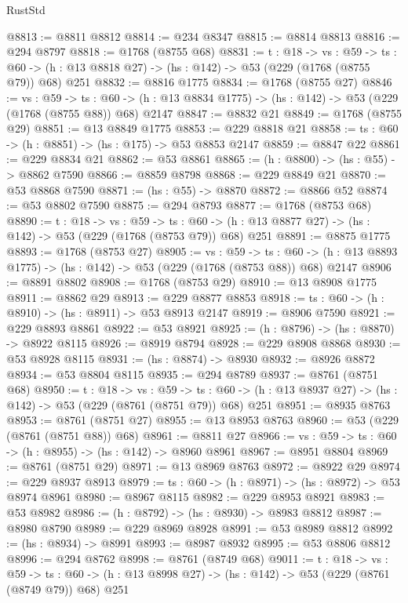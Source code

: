 \begin{lexlean}{RustStd}
\begin{coremodule}
@8813 := @8811 @8812
@8814 := @234 @8347
@8815 := @8814 @8813
@8816 := @294 @8797
@8818 := @1768 (@8755 @68)
@8831 := {t : @18} ->
  {vs : @59} ->
  {ts : @60} -> (h : @13 @8818 @27) -> (hs : @142) -> @53 (@229 (@1768 (@8755 @79)) @68) @251
@8832 := @8816 @1775
@8834 := @1768 (@8755 @27)
@8846 := {vs : @59} ->
  {ts : @60} -> (h : @13 @8834 @1775) -> (hs : @142) -> @53 (@229 (@1768 (@8755 @88)) @68) @2147
@8847 := @8832 @21
@8849 := @1768 (@8755 @29)
@8851 := @13 @8849 @1775
@8853 := @229 @8818 @21
@8858 := {ts : @60} -> (h : @8851) -> (hs : @175) -> @53 @8853 @2147
@8859 := @8847 @22
@8861 := @229 @8834 @21
@8862 := @53 @8861
@8865 := (h : @8800) -> (hs : @55) -> @8862 @7590
@8866 := @8859 @8798
@8868 := @229 @8849 @21
@8870 := @53 @8868 @7590
@8871 := (hs : @55) -> @8870
@8872 := @8866 @52
@8874 := @53 @8802 @7590
@8875 := @294 @8793
@8877 := @1768 (@8753 @68)
@8890 := {t : @18} ->
  {vs : @59} ->
  {ts : @60} -> (h : @13 @8877 @27) -> (hs : @142) -> @53 (@229 (@1768 (@8753 @79)) @68) @251
@8891 := @8875 @1775
@8893 := @1768 (@8753 @27)
@8905 := {vs : @59} ->
  {ts : @60} -> (h : @13 @8893 @1775) -> (hs : @142) -> @53 (@229 (@1768 (@8753 @88)) @68) @2147
@8906 := @8891 @8802
@8908 := @1768 (@8753 @29)
@8910 := @13 @8908 @1775
@8911 := @8862 @29
@8913 := @229 @8877 @8853
@8918 := {ts : @60} -> (h : @8910) -> (hs : @8911) -> @53 @8913 @2147
@8919 := @8906 @7590
@8921 := @229 @8893 @8861
@8922 := @53 @8921
@8925 := (h : @8796) -> (hs : @8870) -> @8922 @8115
@8926 := @8919 @8794
@8928 := @229 @8908 @8868
@8930 := @53 @8928 @8115
@8931 := (hs : @8874) -> @8930
@8932 := @8926 @8872
@8934 := @53 @8804 @8115
@8935 := @294 @8789
@8937 := @8761 (@8751 @68)
@8950 := {t : @18} ->
  {vs : @59} ->
  {ts : @60} -> (h : @13 @8937 @27) -> (hs : @142) -> @53 (@229 (@8761 (@8751 @79)) @68) @251
@8951 := @8935 @8763
@8953 := @8761 (@8751 @27)
@8955 := @13 @8953 @8763
@8960 := @53 (@229 (@8761 (@8751 @88)) @68)
@8961 := @8811 @27
@8966 := {vs : @59} -> {ts : @60} -> (h : @8955) -> (hs : @142) -> @8960 @8961
@8967 := @8951 @8804
@8969 := @8761 (@8751 @29)
@8971 := @13 @8969 @8763
@8972 := @8922 @29
@8974 := @229 @8937 @8913
@8979 := {ts : @60} -> (h : @8971) -> (hs : @8972) -> @53 @8974 @8961
@8980 := @8967 @8115
@8982 := @229 @8953 @8921
@8983 := @53 @8982
@8986 := (h : @8792) -> (hs : @8930) -> @8983 @8812
@8987 := @8980 @8790
@8989 := @229 @8969 @8928
@8991 := @53 @8989 @8812
@8992 := (hs : @8934) -> @8991
@8993 := @8987 @8932
@8995 := @53 @8806 @8812
@8996 := @294 @8762
@8998 := @8761 (@8749 @68)
@9011 := {t : @18} ->
  {vs : @59} ->
  {ts : @60} -> (h : @13 @8998 @27) -> (hs : @142) -> @53 (@229 (@8761 (@8749 @79)) @68) @251

\end{coremodule}
\end{lexlean}
